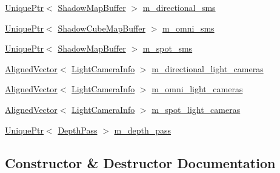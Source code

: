 \begin{DoxyCompactItemize}
\item 
\hyperlink{namespacemage_a3316d7143a973e37adf1110f2e80ca31}{Unique\+Ptr}$<$ \hyperlink{classmage_1_1rendering_1_1_shadow_map_buffer}{Shadow\+Map\+Buffer} $>$ \hyperlink{classmage_1_1rendering_1_1_l_buffer_pass_a76627c9dc2cc229c07584dc2b2599db4}{m\+\_\+directional\+\_\+sms}
\item 
\hyperlink{namespacemage_a3316d7143a973e37adf1110f2e80ca31}{Unique\+Ptr}$<$ \hyperlink{classmage_1_1rendering_1_1_shadow_cube_map_buffer}{Shadow\+Cube\+Map\+Buffer} $>$ \hyperlink{classmage_1_1rendering_1_1_l_buffer_pass_acd46b497a33a96553fa804cb3ebee8ec}{m\+\_\+omni\+\_\+sms}
\item 
\hyperlink{namespacemage_a3316d7143a973e37adf1110f2e80ca31}{Unique\+Ptr}$<$ \hyperlink{classmage_1_1rendering_1_1_shadow_map_buffer}{Shadow\+Map\+Buffer} $>$ \hyperlink{classmage_1_1rendering_1_1_l_buffer_pass_ae3030c5dea15584fd575679c68c6adc8}{m\+\_\+spot\+\_\+sms}
\item 
\hyperlink{namespacemage_a8664bfb5ce2179fc64eae9f82c8a5ba8}{Aligned\+Vector}$<$ \hyperlink{structmage_1_1rendering_1_1_l_buffer_pass_1_1_light_camera_info}{Light\+Camera\+Info} $>$ \hyperlink{classmage_1_1rendering_1_1_l_buffer_pass_a89e1e0ae0ff65c26e18cd7e11e13523f}{m\+\_\+directional\+\_\+light\+\_\+cameras}
\item 
\hyperlink{namespacemage_a8664bfb5ce2179fc64eae9f82c8a5ba8}{Aligned\+Vector}$<$ \hyperlink{structmage_1_1rendering_1_1_l_buffer_pass_1_1_light_camera_info}{Light\+Camera\+Info} $>$ \hyperlink{classmage_1_1rendering_1_1_l_buffer_pass_acf230dbad022cf28a4b87c38ff3439d1}{m\+\_\+omni\+\_\+light\+\_\+cameras}
\item 
\hyperlink{namespacemage_a8664bfb5ce2179fc64eae9f82c8a5ba8}{Aligned\+Vector}$<$ \hyperlink{structmage_1_1rendering_1_1_l_buffer_pass_1_1_light_camera_info}{Light\+Camera\+Info} $>$ \hyperlink{classmage_1_1rendering_1_1_l_buffer_pass_aa888c81683fc9be4cdfab1a49d03eac3}{m\+\_\+spot\+\_\+light\+\_\+cameras}
\item 
\hyperlink{namespacemage_a3316d7143a973e37adf1110f2e80ca31}{Unique\+Ptr}$<$ \hyperlink{classmage_1_1rendering_1_1_depth_pass}{Depth\+Pass} $>$ \hyperlink{classmage_1_1rendering_1_1_l_buffer_pass_a0c721ac882c34c5d6fd6893407fa84f8}{m\+\_\+depth\+\_\+pass}
\end{DoxyCompactItemize}


\subsection{Constructor \& Destructor Documentation}
\hypertarget{classmage_1_1rendering_1_1_l_buffer_pass_a5462eea6f50ed0371185584442d1d21e}{}\label{classmage_1_1rendering_1_1_l_buffer_pass_a5462eea6f50ed0371185584442d1d21e} 
